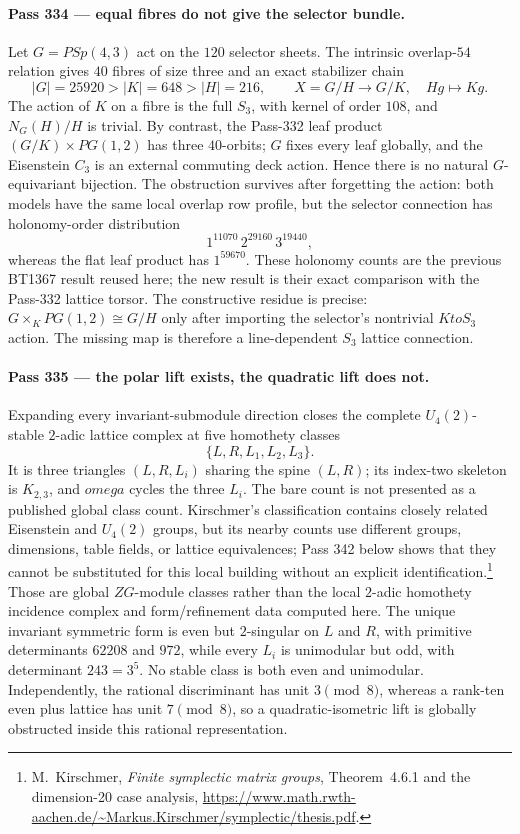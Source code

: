 \documentclass[12pt,a4paper]{article}
\def\mathbb#1{#1}%
\def\mathrm#1{#1}%
\def\omega{omega}%
\def\to{ to }%
\theoremstyle{definition}
\newcommand{\PG}{\mathrm{PG}}
\newcommand{\PSp}{\mathrm{PSp}}
\newcommand{\ZZ}{\mathbb{Z}}
\begin{document}
\paragraph{Pass 334 --- equal fibres do not give the selector bundle.}
Let $G=\PSp(4,3)$ act on the $120$ selector sheets.  The intrinsic overlap-$54$
relation gives $40$ fibres of size three and an exact stabilizer chain
\[
 |G|=25920>|K|=648>|H|=216,
 \qquad X=G/H\longrightarrow G/K,\quad Hg\longmapsto Kg.
\]
The action of $K$ on a fibre is the full $S_3$, with kernel of order $108$,
and $N_G(H)/H$ is trivial.  By contrast, the Pass-332 leaf product
$(G/K)\times\PG(1,2)$ has three $40$-orbits; $G$ fixes every leaf globally, and
the Eisenstein $C_3$ is an external commuting deck action.  Hence there is no
natural $G$-equivariant bijection.  The obstruction survives after forgetting
the action: both models have the same local overlap row profile, but the
selector connection has holonomy-order distribution
\[
 1^{11070}\,2^{29160}\,3^{19440},
 \]
whereas the flat leaf product has $1^{59670}$.  These holonomy counts are the
previous BT1367 result reused here; the new result is their exact comparison
with the Pass-332 lattice torsor.  The constructive residue is precise:
$G\times_K\PG(1,2)\cong G/H$ only after importing the selector's nontrivial
$K\to S_3$ action.  The missing map is therefore a line-dependent $S_3$
lattice connection.

\paragraph{Pass 335 --- the polar lift exists, the quadratic lift does not.}
Expanding every invariant-submodule direction closes the complete
$U_4(2)$-stable $2$-adic lattice complex at five homothety classes
\[
 \{L,R,L_1,L_2,L_3\}.
\]
It is three triangles $(L,R,L_i)$ sharing the spine $(L,R)$; its index-two
skeleton is $K_{2,3}$, and $\omega$ cycles the three $L_i$.  The bare count
is not presented as a published global class count.  Kirschmer's classification
contains closely related Eisenstein and $U_4(2)$ groups, but its nearby counts
use different groups, dimensions, table fields, or lattice equivalences; Pass
342 below shows that they cannot be substituted for this local building without
an explicit identification.\footnote{M.~Kirschmer, \emph{Finite symplectic
matrix groups}, Theorem~4.6.1 and the dimension-20 case analysis,
\url{https://www.math.rwth-aachen.de/~Markus.Kirschmer/symplectic/thesis.pdf}.}
Those are global $\ZZ G$-module classes rather than the local $2$-adic
homothety incidence complex and form/refinement data computed here.  The unique
invariant symmetric form is even but $2$-singular on $L$ and $R$, with
primitive determinants $62208$ and $972$, while every $L_i$ is unimodular but
odd, with determinant $243=3^5$.  No stable class is both even and unimodular.
Independently, the rational discriminant has unit $3\pmod8$, whereas a rank-ten
even plus lattice has unit $7\pmod8$, so a quadratic-isometric lift is globally
obstructed inside this rational representation.
\end{document}
